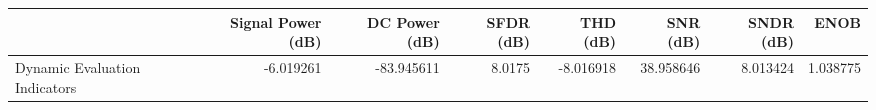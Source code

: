 \begin{tabular}{lrrrrrrr}
\toprule
{} &  Signal Power (dB) &  DC Power (dB) &  SFDR (dB) &  THD (dB) &   SNR (dB) &  SNDR (dB) &      ENOB \\
\midrule
Dynamic Evaluation Indicators &          -6.019261 &     -83.945611 &     8.0175 & -8.016918 &  38.958646 &   8.013424 &  1.038775 \\
\bottomrule
\end{tabular}
